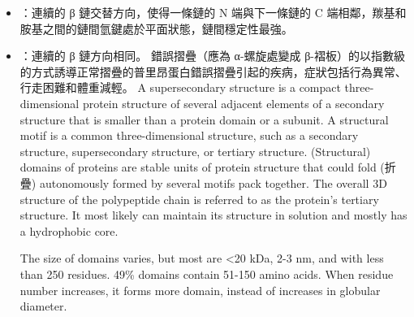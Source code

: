\documentclass[a4paper,12pt]{report}
\begin{document}
\begin{itemize}
\begin{itemize}
\bit
\item {}：連續的 β 鏈交替方向，使得一條鏈的 N 端與下一條鏈的 C 端相鄰，羰基和胺基之間的鏈間氫鍵處於平面狀態，鏈間穩定性最強。
\item {}：連續的 β 鏈方向相同。
\eit
{}
錯誤摺疊（應為 α-螺旋處變成 β-褶板）的以指數級的方式誘導正常摺疊的普里昂蛋白錯誤摺疊引起的疾病，症狀包括行為異常、行走困難和體重減輕。
A supersecondary structure is a compact three-dimensional protein structure of several adjacent elements of a secondary structure that is smaller than a protein domain or a subunit.
A structural motif is a common three-dimensional structure, such as a secondary structure, supersecondary structure, or tertiary structure.
(Structural) domains of proteins are stable units of protein structure that could fold (折疊) autonomously formed by several motifs pack together. The overall 3D structure of the polypeptide chain is referred to as the protein's tertiary structure. It most likely can maintain its structure in solution and mostly has a hydrophobic core.

The size of domains varies, but most are <20 kDa, 2-3 nm, and with less than 250 residues. 49\% domains contain 51-150 amino acids. When residue number increases, it forms more domain, instead of increases in globular diameter.


\end{itemize}
\end{itemize}
\end{document}
